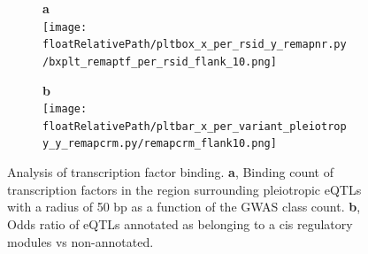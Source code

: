 
\begin{figure}[!tbp]
\centering
%
\begin{subfigure}[]{.33\textwidth}
\textbf{a}
\\
\texttt{[image: \\floatRelativePath/pltbox\_x\_per\_rsid\_y\_remapnr.py/bxplt\_remaptf\_per\_rsid\_flank\_10.png]}
\end{subfigure}
%
\begin{subfigure}[]{.33\textwidth}
\textbf{b}
\\
\texttt{[image: \\floatRelativePath/pltbar\_x\_per\_variant\_pleiotropy\_y\_remapcrm.py/remapcrm\_flank10.png]}
\end{subfigure}
%
\caption{Analysis of transcription factor binding.
\textbf{a}, Binding count of transcription factors in the region surrounding pleiotropic eQTLs with a radius of 50 bp as a function of the GWAS class count.
\textbf{b}, Odds ratio of eQTLs annotated as belonging to a cis regulatory modules vs non-annotated.} \label{fig:freq_tf_per_variant}
%
\end{figure}

%
%
%

